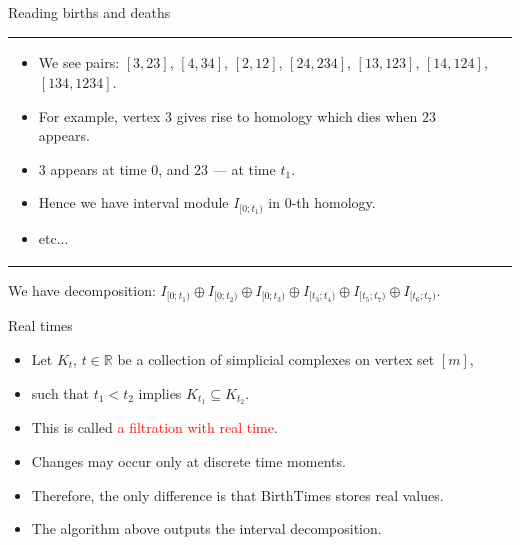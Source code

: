 \documentclass[10pt,xcolor={usenames}]{beamer}
\newcommand{\Ro}{\mathbb{R}}
\begin{document}
\begin{frame}{Reading births and deaths}
\begin{tabular}{M{4cm} p{8cm}}
{\begin{center}
                  \end{center}
  \begin{itemize}
                                                      \item We see pairs: $[3,23]$, $[4,34]$, $[2,12]$, $[24,234]$, $[13,123]$, $[14,124]$, $[134,1234]$.
                                                      \item For example, vertex $3$ gives rise to homology which dies when $23$ appears.
                                                      \item $3$ appears at time $0$, and $23$ --- at time $t_1$.
                                                      \item Hence we have interval module $I_{[0;t_1)}$ in 0-th homology.
                                                      \item etc...
                                                    \end{itemize} }\\
\end{tabular}
We have decomposition: $I_{[0;t_1)}\oplus I_{[0;t_2)}\oplus I_{[0;t_3)}\oplus I_{[t_3;t_4)}\oplus I_{[t_5;t_7)}\oplus I_{[t_6;t_7)}$.

\end{frame}

\begin{frame}{Real times}

\begin{itemize}
  \item Let $K_t$, $t\in\Ro$ be a collection of simplicial complexes on vertex set $[m]$,
  \item such that $t_1<t_2$ implies $K_{t_1}\subseteq K_{t_2}$.
  \item This is called \textcolor{red}{a filtration with real time}.
  \item Changes may occur only at discrete time moments.
  \item Therefore, the only difference is that BirthTimes stores real values.
  \item The algorithm above outputs the interval decomposition.
\end{itemize}

\end{frame}
\end{document}
